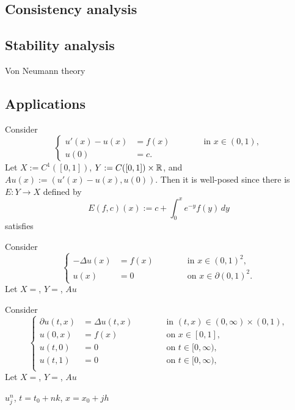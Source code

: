\documentclass[12pt]{article}
\begin{document}
\subsection{Consistency analysis}

\subsection{Stability analysis}
Von Neumann theory



\subsection{Applications}
\begin{ex}
Consider
\[\left\{\begin{alignedat}{2}
u'(x)-u(x)&=f(x) &\qquad&\text{ in }x\in(0,1),\\
u(0)&=c. &&
\end{alignedat}\right.\]
Let $X:=C^1([0,1])$, $Y:=C([0,1])\times\mathbb{R}$, and $Au(x):=(u'(x)-u(x),u(0))$.
Then it is well-posed since there is $E:Y\to X$ defined by
\[E(f,c)(x):=c+\int_0^xe^{-y}f(y)\,dy\]
satisfies
\end{ex}

\begin{ex}
Consider
\[\left\{\begin{alignedat}{2}
-\Delta u(x)&=f(x) &\qquad&\text{ in }x\in(0,1)^2,\\
u(x)&=0 &&\text{ on }x\in\partial(0,1)^2.
\end{alignedat}\right.\]
Let $X=$, $Y=$, $Au$
\end{ex}

\begin{ex}
Consider
\[\left\{\begin{alignedat}{2}
\partial u(t,x)&=\Delta u(t,x) &\qquad&\text{ in }(t,x)\in(0,\infty)\times(0,1),\\
u(0,x)&=f(x) &&\text{ on }x\in[0,1],\\
u(t,0)&=0 &&\text{ on }t\in[0,\infty),\\
u(t,1)&=0 &&\text{ on }t\in[0,\infty),\\
\end{alignedat}\right.\]
Let $X=$, $Y=$, $Au$
\end{ex}


$u_j^n$, $t=t_0+nk$, $x=x_0+jh$



\newpage
\end{document}
